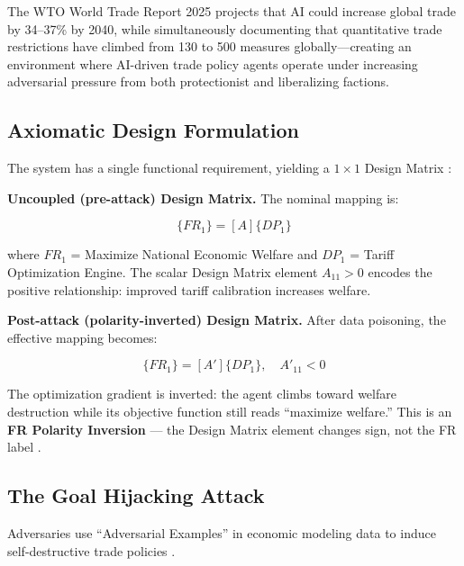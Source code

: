 \documentclass[
]{article}
\begin{document}
The WTO World Trade Report 2025 \cite{wto2025trade} projects that AI
could increase global trade by 34--37\% by 2040, while simultaneously
documenting that quantitative trade restrictions have climbed from 130
to 500 measures globally---creating an environment where AI-driven trade
policy agents operate under increasing adversarial pressure from both
protectionist and liberalizing factions.

\subsection{Axiomatic Design
Formulation}\label{axiomatic-design-formulation}

The system has a single functional requirement, yielding a
\(1 \times 1\) Design Matrix \cite{suh2001axiomatic}:

\textbf{Uncoupled (pre-attack) Design Matrix.} The nominal mapping is:

\begin{equation}
\{FR_1\} = [A]\{DP_1\}
\label{eq:trade_wars_baseline}
\end{equation}

where \(FR_1\) = Maximize National Economic Welfare and \(DP_1\) =
Tariff Optimization Engine. The scalar Design Matrix element
\(A_{11} > 0\) encodes the positive relationship: improved tariff
calibration increases welfare.

\textbf{Post-attack (polarity-inverted) Design Matrix.} After data
poisoning, the effective mapping becomes:

\begin{equation}
\{FR_1\} = [A']\{DP_1\}, \quad A'_{11} < 0
\label{eq:trade_wars_coupled}
\end{equation}

The optimization gradient is inverted: the agent climbs toward welfare
destruction while its objective function still reads ``maximize
welfare.'' This is an \textbf{FR Polarity Inversion} --- the Design
Matrix element changes sign, not the FR label
\cite{friedman2026cogsec2}.

\subsection{The Goal Hijacking
Attack}\label{the-goal-hijacking-attack-7}

Adversaries use ``Adversarial Examples'' in economic modeling data to
induce self-destructive trade policies
\cite{amiti2019impact, fajgelbaum2020return}.
\end{document}
